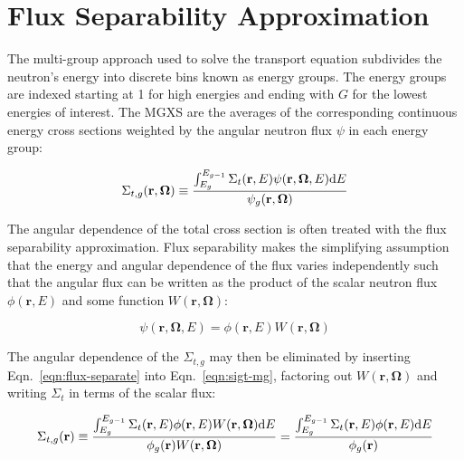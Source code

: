 \section{Flux Separability Approximation}
\label{sec:flux-separability}

The multi-group approach used to solve the transport equation subdivides the neutron's energy into discrete bins known as energy groups. The energy groups are indexed starting at 1 for high energies and ending with $G$ for the lowest energies of interest. The MGXS are the averages of the corresponding continuous energy cross sections weighted by the angular neutron flux $\psi$ in each energy group:

\begin{dmath}
\label{eqn:sigt-mg}
\Sigma_{t,g}(\mathbf{r},\mathbf{\Omega}) \equiv \frac{\int\displaylimits_{E_{g}}^{E_{g-1}} \Sigma_{t}(\mathbf{r},E)\psi(\mathbf{r},\mathbf{\Omega},E)\mathrm{d}E}{\psi_{g}(\mathbf{r},\mathbf{\Omega})}
\end{dmath}

The angular dependence of the total cross section is often treated with the flux separability approximation. Flux separability makes the simplifying assumption that the energy and angular dependence of the flux varies independently such that the angular flux can be written as the product of the scalar neutron flux $\phi(\mathbf{r},E)$ and some function $W(\mathbf{r}, \mathbf{\Omega})$:

\begin{dmath}
\label{eqn:flux-separate}
\psi(\mathbf{r},\mathbf{\Omega},E) = \phi(\mathbf{r},E) W(\mathbf{r},\mathbf{\Omega})
\end{dmath}

\noindent The angular dependence of the $\Sigma_{t,g}$ may then be eliminated by inserting Eqn.~\ref{eqn:flux-separate} into Eqn.~\ref{eqn:sigt-mg}, factoring out $W(\mathbf{r},\mathbf{\Omega})$ and writing $\Sigma_{t}$ in terms of the scalar flux:

\begin{dmath}
\label{eqn:sigt-mg-scalar}
\Sigma_{t,g}(\mathbf{r}) \equiv \frac{\int\displaylimits_{E_{g}}^{E_{g-1}} \Sigma_{t}(\mathbf{r},E)\phi(\mathbf{r},E)W(\mathbf{r},\mathbf{\Omega})\mathrm{d}E}{\phi_{g}(\mathbf{r})W(\mathbf{r},\mathbf{\Omega})} = \frac{\int\displaylimits_{E_{g}}^{E_{g-1}} \Sigma_{t}(\mathbf{r},E)\phi(\mathbf{r},E)\mathrm{d}E}{\phi_{g}(\mathbf{r})}
\end{dmath}

